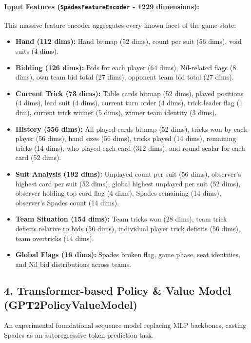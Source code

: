 \documentclass{article}
\begin{document}
\paragraph{Input Features (\texttt{SpadesFeatureEncoder} - 1229 dimensions):}
This massive feature encoder aggregates every known facet of the game state:
\begin{itemize}
    \item \textbf{Hand (112 dims):} Hand bitmap (52 dims), count per suit (56 dims), void suits (4 dims).
    \item \textbf{Bidding (126 dims):} Bids for each player (64 dims), Nil-related flags (8 dims), own team bid total (27 dims), opponent team bid total (27 dims).
    \item \textbf{Current Trick (73 dims):} Table cards bitmap (52 dims), played positions (4 dims), lead suit (4 dims), current turn order (4 dims), trick leader flag (1 dim), current trick winner (5 dims), winner team identity (3 dims).
    \item \textbf{History (556 dims):} All played cards bitmap (52 dims), tricks won by each player (56 dims), hand sizes (56 dims), tricks played (14 dims), remaining tricks (14 dims), who played each card (312 dims), and round scalar for each card (52 dims).
    \item \textbf{Suit Analysis (192 dims):} Unplayed count per suit (56 dims), observer's highest card per suit (52 dims), global highest unplayed per suit (52 dims), observer holding top card flag (4 dims), Spades remaining (14 dims), observer's Spades count (14 dims).
    \item \textbf{Team Situation (154 dims):} Team tricks won (28 dims), team trick deficits relative to bids (56 dims), individual player trick deficits (56 dims), team overtricks (14 dims).
    \item \textbf{Global Flags (16 dims):} Spades broken flag, game phase, seat identities, and Nil bid distributions across teams.
\end{itemize}

\subsection{4. Transformer-based Policy \& Value Model (GPT2PolicyValueModel)}

An experimental foundational sequence model replacing MLP backbones, casting Spades as an autoregressive token prediction task. 
\end{document}
